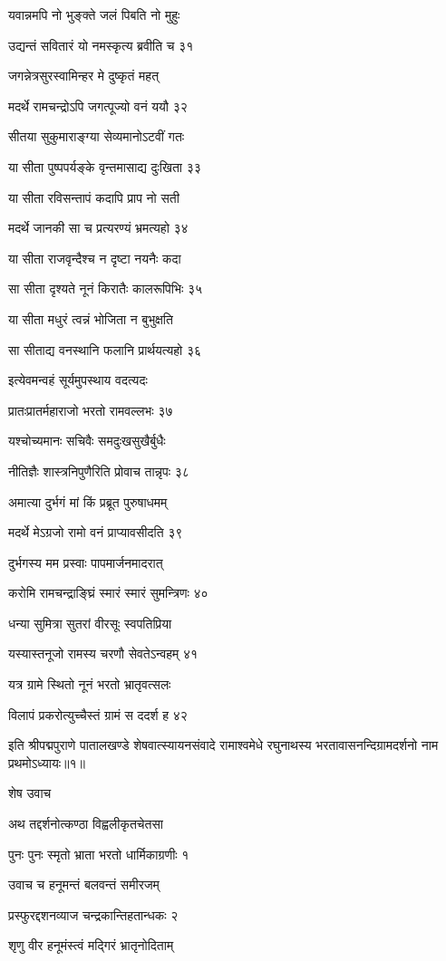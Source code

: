 यवान्नमपि नो भुङ्क्ते जलं पिबति नो मुहुः

उद्यन्तं सवितारं यो नमस्कृत्य ब्रवीति च ३१

जगन्नेत्रसुरस्वामिन्हर मे दुष्कृतं महत्

मदर्थे रामचन्द्रोऽपि जगत्पूज्यो वनं ययौ ३२

सीतया सुकुमाराङ्ग्या सेव्यमानोऽटवीं गतः

या सीता पुष्पपर्यङ्के वृन्तमासाद्य दुःखिता ३३

या सीता रविसन्तापं कदापि प्राप नो सती

मदर्थे जानकी सा च प्रत्यरण्यं भ्रमत्यहो ३४

या सीता राजवृन्दैश्च न दृष्टा नयनैः कदा

सा सीता दृश्यते नूनं किरातैः कालरूपिभिः ३५

या सीता मधुरं त्वन्नं भोजिता न बुभुक्षति

सा सीताद्य वनस्थानि फलानि प्रार्थयत्यहो ३६

इत्येवमन्वहं सूर्यमुपस्थाय वदत्यदः

प्रातःप्रातर्महाराजो भरतो रामवल्लभः ३७

यश्चोच्यमानः सचिवैः समदुःखसुखैर्बुधैः

नीतिज्ञैः शास्त्रनिपुणैरिति प्रोवाच तान्नृपः ३८

अमात्या दुर्भगं मां किं प्रब्रूत पुरुषाधमम्

मदर्थे मेऽग्रजो रामो वनं प्राप्यावसीदति ३९

दुर्भगस्य मम प्रस्वाः पापमार्जनमादरात्

करोमि रामचन्द्राङ्घ्रिं स्मारं स्मारं सुमन्त्रिणः ४०

धन्या सुमित्रा सुतरां वीरसूः स्वपतिप्रिया

यस्यास्तनूजो रामस्य चरणौ सेवतेऽन्वहम् ४१

यत्र ग्रामे स्थितो नूनं भरतो भ्रातृवत्सलः

विलापं प्रकरोत्युच्चैस्तं ग्रामं स ददर्श ह ४२

इति श्रीपद्मपुराणे पातालखण्डे शेषवात्स्यायनसंवादे रामाश्वमेधे रघुनाथस्य भरतावासनन्दिग्रामदर्शनो नाम प्रथमोऽध्यायः॥१॥


शेष उवाच

अथ तद्दर्शनोत्कण्ठा विह्वलीकृतचेतसा

पुनः पुनः स्मृतो भ्राता भरतो धार्मिकाग्रणीः १

उवाच च हनूमन्तं बलवन्तं समीरजम्

प्रस्फुरद्दशनव्याज चन्द्रकान्तिहतान्धकः २

शृणु वीर हनूमंस्त्वं मद्गिरं भ्रातृनोदिताम्

